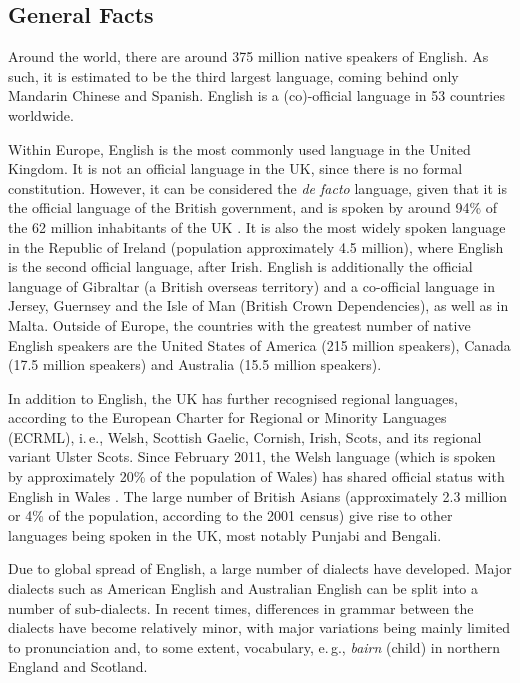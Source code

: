 \begin{multicols}{2}

\subsection{General Facts}

Around the world, there are around 375 million native speakers of English. As such, it is estimated to be the third largest language, coming behind only Mandarin Chinese and Spanish. English is a (co)-official language in 53 countries worldwide.   
    
Within Europe, English is the most commonly used language in the United Kingdom. It is not an official language in the UK, since there is no formal constitution. However, it can be considered the \textit{de facto} language, given that it is the official language of the British government, and is spoken by around 94\% of the 62 million inhabitants of the UK \cite{Leg1}. It is also the most widely spoken language in the Republic of Ireland (population approximately 4.5 million), where English is the second official language, after Irish.  English is additionally the official language of Gibraltar (a British overseas territory) and a co-official language in Jersey, Guernsey and the Isle of Man (British Crown Dependencies), as well as in Malta. Outside of Europe, the countries with the greatest number of native English speakers are the United States of America (215 million speakers), Canada (17.5 million speakers) and Australia (15.5 million speakers).
    
In addition to English, the UK has further recognised regional languages, according to the European Charter for Regional or Minority Languages (ECRML), i.\,e., Welsh, Scottish Gaelic, Cornish, Irish, Scots, and its regional variant Ulster Scots. Since February 2011, the Welsh language (which is spoken by approximately 20\% of the population of Wales) has shared official status with English in Wales \cite{Leg2}.  The large number of British Asians (approximately 2.3 million or 4\% of the population, according to the 2001 census) give rise to other languages being spoken in the UK, most notably Punjabi and Bengali. 
    
    
Due to global spread of English, a large number of dialects have developed. Major dialects such as American English and Australian English can be split into a number of sub-dialects. In recent times, differences in grammar between the dialects have become relatively minor, with major variations being mainly limited to pronunciation and, to some extent, vocabulary, e.\,g., \textit{bairn} (child) in northern England and Scotland.         
    

\end{multicols}
